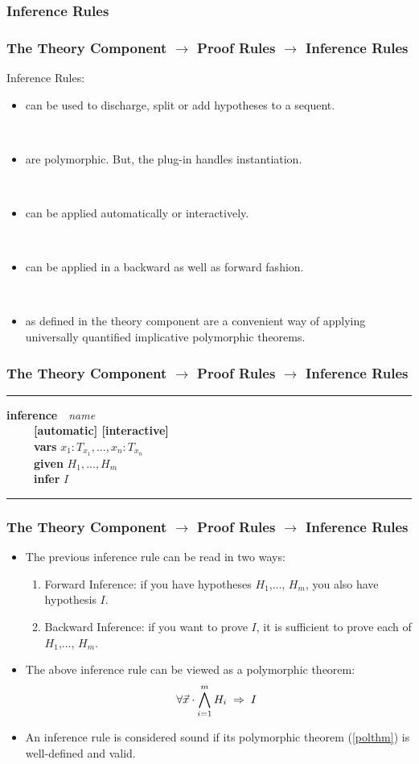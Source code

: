 \documentclass{beamer}
\begin{document}
\subsubsection{Inference Rules}
	\begin{frame}
		\frametitle{The Theory Component $\rightarrow$ Proof Rules $\rightarrow$ Inference Rules}
		Inference Rules:
		\begin{itemize}
			\item can be used to discharge, split or add hypotheses to a sequent.

~

			\item are polymorphic. But, the plug-in handles instantiation.

~
			\item can be applied automatically or interactively. 

~
			\item can be applied in a backward as well as forward fashion.

~
			\item as defined in the theory component are a convenient way of applying universally quantified implicative polymorphic theorems.
		\end{itemize}
	\end{frame}
	\begin{frame}
		\frametitle{The Theory Component $\rightarrow$ Proof Rules $\rightarrow$ Inference Rules}
		\hrule
		\vspace{4pt}
		\textbf{inference}~~\textit{name}\\
		$~~~~~~~~~~~$\textbf{[automatic] [interactive]}\\
		$~~~~~~~~~~~$\textbf{vars} $x_1:T_{x_1},..., x_n:T_{x_n}$\\
		$~~~~~~~~~~~$\textbf{given} $H_1,...,H_m$\\
		$~~~~~~~~~~~$\textbf{infer} $I$\\
		\vspace{4pt}
		\hrule
	\end{frame}
	\begin{frame}
		\frametitle{The Theory Component $\rightarrow$ Proof Rules $\rightarrow$ Inference Rules}
		\begin{itemize}
			\item The previous inference rule can be read in two ways:
				\begin{enumerate}
					\item Forward Inference: if you have hypotheses $H_1$,..., $H_m$, you also have hypothesis $I$.
					\item Backward Inference: if you want to prove $I$, it is sufficient to prove each of $H_1$,..., $H_m$.
				\end{enumerate}
			\item The above inference rule can be viewed as a polymorphic theorem:
				\begin{equation}
					\forall \vec{x} \cdot \bigwedge_{i=1}^{m} H_i ~\mathbin\Rightarrow~ I~ \label{polthm}
				\end{equation}
			\item An inference rule is considered sound if its polymorphic theorem (\ref{polthm}) is well-defined and valid.
		\end{itemize}
	\end{frame}
\end{document}

